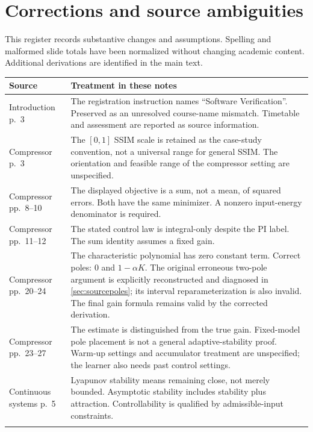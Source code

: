 \documentclass[11pt,a4paper]{article}
\numberwithin{equation}{section}
\numberwithin{figure}{section}
\numberwithin{table}{section}
\begin{document}
\par\endgroup
\appendix
\clearpage
\section{Corrections and source ambiguities}\label{app:corrections}
This register records substantive changes and assumptions. Spelling and malformed slide totals have been normalized without changing academic content. Additional derivations are identified in the main text.

\begin{longtable}{@{}P{33mm}P{116mm}@{}}
\toprule Source & Treatment in these notes\\\midrule\endhead
Introduction p.\ 3 & The registration instruction names ``Software Verification''. Preserved as an unresolved course-name mismatch. Timetable and assessment are reported as source information.\\\addlinespace
Compressor p.\ 3 & The $[0,1]$ SSIM scale is retained as the case-study convention, not a universal range for general SSIM. The orientation and feasible range of the compressor setting are unspecified.\\\addlinespace
Compressor pp.\ 8--10 & The displayed objective is a sum, not a mean, of squared errors. Both have the same minimizer. A nonzero input-energy denominator is required.\\\addlinespace
Compressor pp.\ 11--12 & The stated control law is integral-only despite the PI label. The sum identity assumes a fixed gain.\\\addlinespace
Compressor pp.\ 20--24 & The characteristic polynomial has zero constant term. Correct poles: $0$ and $1-\alpha K$. The original erroneous two-pole argument is explicitly reconstructed and diagnosed in \cref{sec:sourcepoles}; its interval reparameterization is also invalid. The final gain formula remains valid by the corrected derivation.\\\addlinespace
Compressor pp.\ 23--27 & The estimate is distinguished from the true gain. Fixed-model pole placement is not a general adaptive-stability proof. Warm-up settings and accumulator treatment are unspecified; the learner also needs past control settings.\\\addlinespace
Continuous systems p.\ 5 & Lyapunov stability means remaining close, not merely bounded. Asymptotic stability includes stability plus attraction. Controllability is qualified by admissible-input constraints.\\\addlinespace

\end{longtable}
\end{document}
